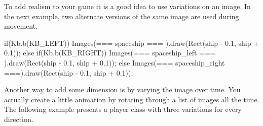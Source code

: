To add realism to your game it is a good idea to use variations on an image. In the next example, two alternate versions of the same image are used during movement.

\begin{code}
if(Kb.b(KB_LEFT))
{
	Images(=== spaceship ===      ).draw(Rect(ship - 0.1,  ship + 0.1));
} else if(Kb.b(KB_RIGHT))
{
	Images(=== spaceship_left === ).draw(Rect(ship - 0.1,  ship + 0.1));
} else
{
	Images(=== spaceship_right ===).draw(Rect(ship - 0.1,  ship + 0.1));
}
\end{code}

Another way to add some dimension is by varying the image over time. You actually create a little animation by rotating through a list of images all the time. The following example presents a player class with three variations for every direction.

